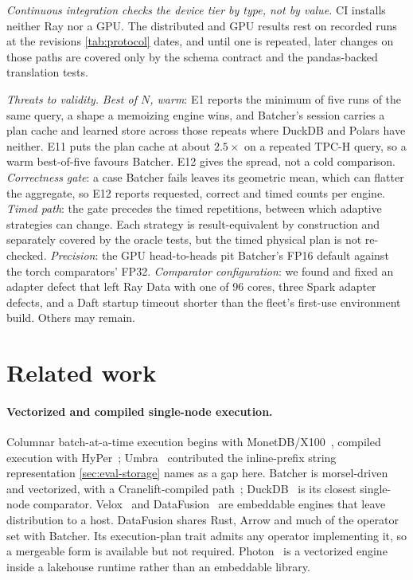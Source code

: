\documentclass[10pt,twocolumn,letterpaper]{article}   %
\newcommand{\sys}{Batcher}
\newcommand{\E}[1]{\textsf{E#1}}
\begin{document}
\emph{Continuous integration checks the device tier by type, not by value.} CI installs neither
Ray nor a GPU. The distributed and GPU results rest on recorded runs at the revisions
\cref{tab:protocol} dates, and until one is repeated, later changes on those paths are covered
only by the schema contract and the pandas-backed translation tests.

\emph{Threats to validity.} \emph{Best of $N$, warm}: \E{1} reports the minimum of five runs of
the same query, a shape a memoizing engine wins, and \sys{}'s session carries a plan cache and
learned store across those repeats where DuckDB and Polars have neither. \E{11} puts the plan
cache at about $2.5\times$ on a repeated TPC-H query, so a warm best-of-five favours \sys{}.
\E{12} gives the spread, not a cold comparison. \emph{Correctness gate}: a case \sys{} fails
leaves its geometric mean, which can flatter the aggregate, so \E{12} reports requested, correct
and timed counts per engine. \emph{Timed path}: the gate precedes the timed repetitions, between
which adaptive strategies can change. Each strategy is result-equivalent by construction and
separately covered by the oracle tests, but the timed physical plan is not re-checked.
\emph{Precision}: the GPU head-to-heads pit \sys{}'s FP16 default against the torch
comparators' FP32. \emph{Comparator configuration}: we found and fixed an adapter defect that
left Ray Data with one of 96 cores, three Spark adapter defects, and a Daft startup timeout
shorter than the fleet's first-use environment build. Others may remain.

\section{Related work}
\label{sec:related}

\paragraph{Vectorized and compiled single-node execution.} Columnar batch-at-a-time execution
begins with MonetDB/X100~\cite{boncz2005monetdb}, compiled execution with
HyPer~\cite{neumann2011compiling}; Umbra~\cite{neumann2020umbra} contributed the inline-prefix
string representation \cref{sec:eval-storage} names as a gap here. \sys{} is
morsel-driven~\cite{leis2014morsel} and vectorized, with a Cranelift-compiled
path~\cite{cranelift}; DuckDB~\cite{raasveldt2019duckdb} is its closest single-node comparator.
Velox~\cite{pedreira2022velox} and DataFusion~\cite{lamb2024datafusion} are embeddable engines
that leave distribution to a host. DataFusion shares Rust, Arrow and much of the operator set
with \sys{}. Its execution-plan trait admits any operator implementing it, so a mergeable form
is available but not required. Photon~\cite{behm2022photon} is a vectorized engine inside a
lakehouse runtime rather than an embeddable library.
\end{document}
